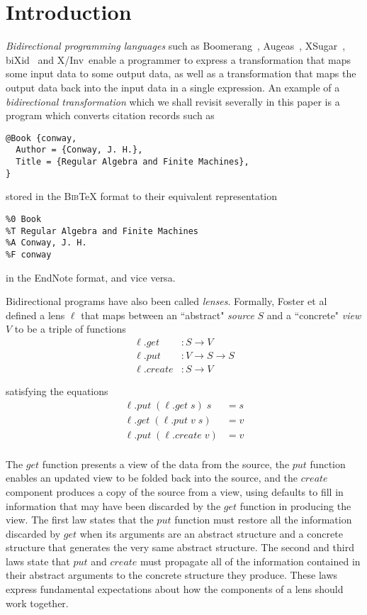 \documentclass{svproc}
\newcommand{\bibtex}{\textsc{Bib}\TeX{}}
\newcommand{\get}{\ensuremath{\mathit{get}}}
\newcommand{\lput}{\ensuremath{\mathit{put}}}
\newcommand{\create}{\ensuremath{\mathit{create}}}
\begin{document}
\section{Introduction}
{\em Bidirectional programming languages} such as
Boomerang~\cite{boomerang}, Augeas~\cite{augeas}, XSugar~\cite{xsugar},
biXid~\cite{bixid} and X/Inv~\cite{xinv}enable a programmer to express a
transformation that maps some input data to some output data, as well as a
transformation that maps the output data back into the input data in a single
expression. An example of a {\em bidirectional transformation} which we shall
revisit severally in this paper is a program which converts citation records
such as
\begin{verbatim}
@Book {conway,
  Author = {Conway, J. H.},
  Title = {Regular Algebra and Finite Machines},
}
\end{verbatim}

\noindent stored in the \bibtex{} format to their equivalent representation 
\begin{verbatim}
%0 Book
%T Regular Algebra and Finite Machines
%A Conway, J. H.
%F conway
\end{verbatim}

\noindent in the EndNote format, and vice versa.

Bidirectional programs have also been called {\em lenses}. Formally, Foster et
al~\cite{foster} defined a lens $\ell$ that maps between an ``abstract" {\em
source} $S$ and a ``concrete" {\em view} $V$ to be a triple of functions
\begin{align*}
\ell.get &: S \longrightarrow V\\
\ell.put &: V \longrightarrow S \longrightarrow S\\
\ell.create &: S \longrightarrow V
\end{align*} 

\noindent satisfying the equations
\begin{align*}
\ell.\lput \; (\ell.\get \; s) \; s &= s\\
\ell.\get \; (\ell.\lput \; v \; s) &= v\\
\ell.\lput \; (\ell.\create \; v) &= v\\
\end{align*}

The $\get$ function presents a view of the data from the source, the
$\lput$ function enables an updated view to be folded back into the source, and
the $\create$ component produces a copy of the source from a view, using
defaults to fill in information that may have been discarded by the $\get$
function in producing the view. The first law states that the $\lput$ function
must restore all the information discarded by $\get$ when its arguments are an
abstract structure and a concrete structure that generates the very same
abstract structure. The second and third laws state that $\lput$ and $\create$
must propagate all of the information contained in their abstract arguments to
the concrete structure they produce. These laws express fundamental expectations
about how the components of a lens should work together.
\end{document}
